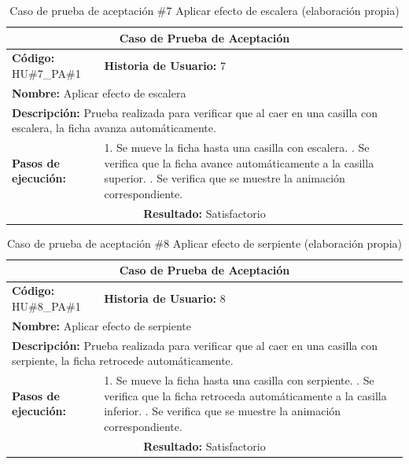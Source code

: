 \begin{table}[H]
\centering
\caption{Caso de prueba de aceptación \#7 Aplicar efecto de escalera (elaboración propia)\label{tab:cpa7}}
\renewcommand{\arraystretch}{1.3}
\begin{tabular}{|p{}|p{}|}
\hline
\multicolumn{2}{|c|}{\textbf{Caso de Prueba de Aceptación}} \\
\hline
\textbf{Código:} HU\#7\_PA\#1 & \textbf{Historia de Usuario:} 7 \\
\hline
\multicolumn{2}{|l|}{\textbf{Nombre:} Aplicar efecto de escalera} \\
\hline
\multicolumn{2}{|p{0.9\textwidth}|}{\textbf{Descripción:} Prueba realizada para verificar que al caer en una casilla con escalera, la ficha avanza automáticamente.} \\
\hline
\textbf{Pasos de ejecución:} & 1. Se mueve la ficha hasta una casilla con escalera. \newline 2. Se verifica que la ficha avance automáticamente a la casilla superior. \newline 3. Se verifica que se muestre la animación correspondiente. \\
\hline
\multicolumn{2}{|c|}{\textbf{Resultado:} Satisfactorio} \\
\hline
\end{tabular}
\end{table}

\begin{table}[H]
\centering
\caption{Caso de prueba de aceptación \#8 Aplicar efecto de serpiente (elaboración propia)\label{tab:cpa8}}
\renewcommand{\arraystretch}{1.3}
\begin{tabular}{|p{}|p{}|}
\hline
\multicolumn{2}{|c|}{\textbf{Caso de Prueba de Aceptación}} \\
\hline
\textbf{Código:} HU\#8\_PA\#1 & \textbf{Historia de Usuario:} 8 \\
\hline
\multicolumn{2}{|l|}{\textbf{Nombre:} Aplicar efecto de serpiente} \\
\hline
\multicolumn{2}{|p{0.9\textwidth}|}{\textbf{Descripción:} Prueba realizada para verificar que al caer en una casilla con serpiente, la ficha retrocede automáticamente.} \\
\hline
\textbf{Pasos de ejecución:} & 1. Se mueve la ficha hasta una casilla con serpiente. \newline 2. Se verifica que la ficha retroceda automáticamente a la casilla inferior. \newline 3. Se verifica que se muestre la animación correspondiente. \\
\hline
\multicolumn{2}{|c|}{\textbf{Resultado:} Satisfactorio} \\
\hline
\end{tabular}
\end{table}

